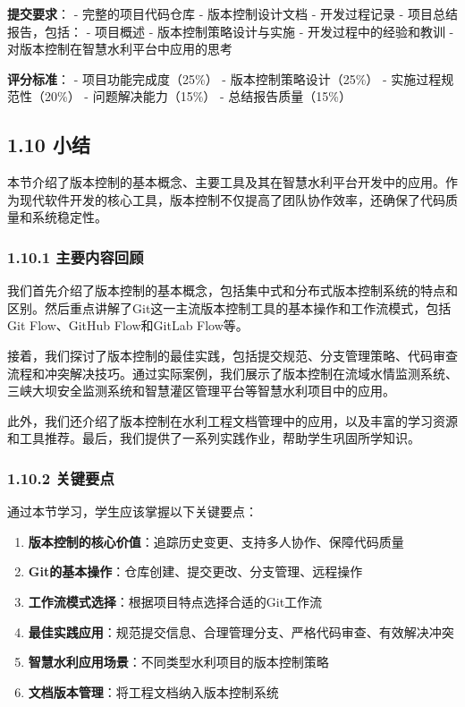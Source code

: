 \textbf{提交要求}： - 完整的项目代码仓库 - 版本控制设计文档 -
开发过程记录 - 项目总结报告，包括： - 项目概述 - 版本控制策略设计与实施
- 开发过程中的经验和教训 - 对版本控制在智慧水利平台中应用的思考

\textbf{评分标准}： - 项目功能完成度（25\%） - 版本控制策略设计（25\%）
- 实施过程规范性（20\%） - 问题解决能力（15\%） - 总结报告质量（15\%）

\subsection{1.10 小结}\label{ux5c0fux7ed3}

本节介绍了版本控制的基本概念、主要工具及其在智慧水利平台开发中的应用。作为现代软件开发的核心工具，版本控制不仅提高了团队协作效率，还确保了代码质量和系统稳定性。

\subsubsection{1.10.1
主要内容回顾}\label{ux4e3bux8981ux5185ux5bb9ux56deux987e}

我们首先介绍了版本控制的基本概念，包括集中式和分布式版本控制系统的特点和区别。然后重点讲解了Git这一主流版本控制工具的基本操作和工作流模式，包括Git
Flow、GitHub Flow和GitLab Flow等。

接着，我们探讨了版本控制的最佳实践，包括提交规范、分支管理策略、代码审查流程和冲突解决技巧。通过实际案例，我们展示了版本控制在流域水情监测系统、三峡大坝安全监测系统和智慧灌区管理平台等智慧水利项目中的应用。

此外，我们还介绍了版本控制在水利工程文档管理中的应用，以及丰富的学习资源和工具推荐。最后，我们提供了一系列实践作业，帮助学生巩固所学知识。

\subsubsection{1.10.2 关键要点}\label{ux5173ux952eux8981ux70b9}

通过本节学习，学生应该掌握以下关键要点：

\begin{enumerate}
\def\labelenumi{\arabic{enumi}.}
\tightlist
\item
  \textbf{版本控制的核心价值}：追踪历史变更、支持多人协作、保障代码质量
\item
  \textbf{Git的基本操作}：仓库创建、提交更改、分支管理、远程操作
\item
  \textbf{工作流模式选择}：根据项目特点选择合适的Git工作流
\item
  \textbf{最佳实践应用}：规范提交信息、合理管理分支、严格代码审查、有效解决冲突
\item
  \textbf{智慧水利应用场景}：不同类型水利项目的版本控制策略
\item
  \textbf{文档版本管理}：将工程文档纳入版本控制系统
\end{enumerate}

